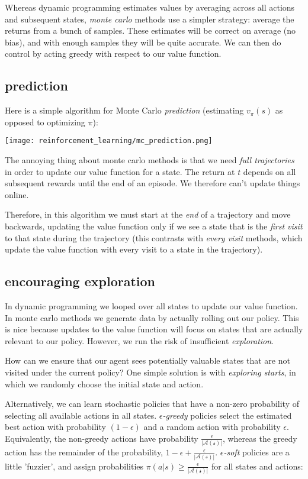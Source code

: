 Whereas dynamic programming estimates values by averaging across all actions and subsequent states, \textit{monte carlo} methods use a simpler strategy: average the returns from a bunch of samples. These estimates will be correct on average (no bias), and with enough samples they will be quite accurate. We can then do control by acting greedy with respect to our value function.

\subsection{prediction}
Here is a simple algorithm for Monte Carlo \textit{prediction} (estimating $v_\pi(s)$ as opposed to optimizing $\pi$):

\begin{center}\texttt{[image: reinforcement\_learning/mc\_prediction.png]}\end{center}

The annoying thing about monte carlo methods is that we need \textit{full trajectories} in order to update our value function for a state. The return at $t$ depends on all subsequent rewards until the end of an episode. We therefore can't update things online.

Therefore, in this algorithm we must start at the \textit{end} of a trajectory and move backwards, updating the value function only if we see a state that is the \textit{first visit} to that state during the trajectory (this contrasts with \textit{every visit} methods, which update the value function with every visit to a state in the trajectory).

\subsection{encouraging exploration}
In dynamic programming we looped over all states to update our value function. In monte carlo methods we generate data by actually rolling out our policy. This is nice because updates to the value function will focus on states that are actually relevant to our policy. However, we run the risk of insufficient \textit{exploration}.

How can we ensure that our agent sees potentially valuable states that are not visited under the current policy? One simple solution is with \textit{exploring starts}, in which we randomly choose the initial state and action.

Alternatively, we can learn stochastic policies that have a non-zero probability of selecting all available actions in all states. $\epsilon$\textit{-greedy} policies select the estimated best action with probability $(1-\epsilon)$ and a random action with probability $\epsilon$. Equivalently, the non-greedy actions have probability $\frac{\epsilon}{|\mathcal{A(s)}|}$, whereas the greedy action has the remainder of the probability, $1 - \epsilon + \frac{\epsilon}{|\mathcal{A(s)}|}$. $\epsilon$\textit{-soft} policies are a little 'fuzzier', and assign probabilities $\pi(a|s) \geq \frac{\epsilon}{|\mathcal{A(s)}|}$ for all states and actions:

